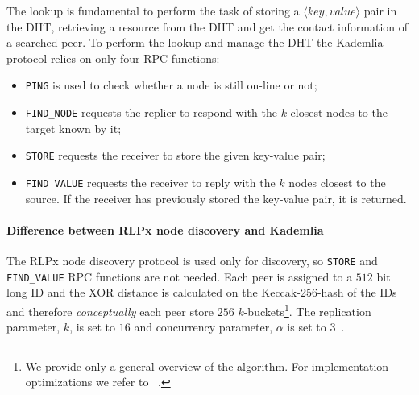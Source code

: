 The lookup is fundamental to perform the task of storing a $\langle key,
value\rangle$ pair in the DHT, retrieving a resource from the DHT and get
the contact information of a searched peer.
To perform the lookup and manage the DHT the Kademlia protocol relies on only
four RPC functions:
\begin{itemize}
    \item \verb|PING| is used to check whether a node is still on-line
    or not;
    \item \verb|FIND_NODE| requests the replier to respond with the $k$ closest
    nodes to the target known by it;
    \item \verb|STORE| requests the receiver to store the given
    key-value pair;
    \item \verb|FIND_VALUE| requests the receiver to reply with the $k$
    nodes closest to the source. If the receiver has previously stored the
    key-value pair, it is returned.
\end{itemize}


\paragraph{Difference between RLPx node discovery and Kademlia}
\label{sec:rlpx-discovery}
The RLPx node discovery protocol is used only for discovery, so
\verb|STORE| and \verb|FIND_VALUE| RPC functions are not
needed.
Each peer is assigned to a $512$ bit long ID and the XOR distance is calculated
on the Keccak-256-hash of the IDs and therefore
\emph{conceptually} each peer store $256$ $k$-buckets\footnote{
    We provide only a general overview of the algorithm. For implementation
    optimizations we refer to ~\cite{bib:kademlia}.}.
The replication parameter, $k$, is set to $16$ and concurrency parameter,
$\alpha$ is set to $3$~\cite{bib:rlpx-discovery-protocol}.

